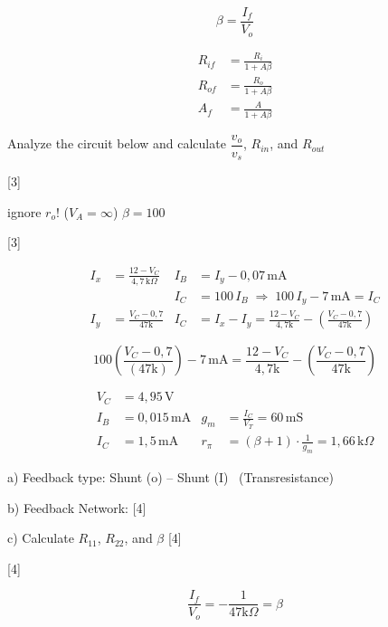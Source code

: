 \documentclass[11pt,a4paper]{article}
\begin{document}
\[ \beta = \frac{I_f}{V_o} \]

\begin{align*}
  R_{if} &= \frac{R_i}{1+A\beta} \\
  R_{of} &= \frac{R_o}{1+A\beta} \\
  A_f &= \frac{A}{1+A\beta}
\end{align*}

\begin{ornek}[2]
  Analyze the circuit below and calculate $\dfrac{v_o}{v_s}$, $R_{in}$, and $R_{out}$

  [3]

  ignore $r_o$! ($V_A=\infty$) \qquad $\beta=100$
\end{ornek}

[3]

\begin{align*}
  I_x &= \frac{12-V_C}{4{,}7\,\mathrm{k}\Omega} & I_B &= I_y - 0{,}07\,\mathrm{mA} \\
  & & I_C &= 100\,I_B \;\Rightarrow\; 100\,I_y - 7\,\mathrm{mA} = I_C \\
  I_y &= \frac{V_C-0{,}7}{47\mathrm{k}} & I_C &= I_x - I_y = \frac{12-V_C}{4{,}7\mathrm{k}} - \left(\frac{V_C-0{,}7}{47\mathrm{k}}\right)
\end{align*}

\[ 100\left(\frac{V_C-0{,}7}{(47\mathrm{k})}\right) - 7\,\mathrm{mA} = \frac{12-V_C}{4{,}7\mathrm{k}} - \left(\frac{V_C-0{,}7}{47\mathrm{k}}\right) \]

\begin{align*}
  V_C &= 4{,}95\,\mathrm{V} & & \\
  I_B &= 0{,}015\,\mathrm{mA} & g_m &= \frac{I_C}{V_T} = 60\,\mathrm{mS} \\
  I_C &= 1{,}5\,\mathrm{mA} & r_\pi &= (\beta+1)\cdot\frac{1}{g_m} = 1{,}66\,\mathrm{k}\Omega
\end{align*}

a) Feedback type: Shunt (o) -- Shunt (I) \ \textcolor{turuncukalem}{(Transresistance)}

b) Feedback Network:
[4]

c) Calculate $R_{11}$, $R_{22}$, and $\beta$
[4]

[4]

\[ \frac{I_f}{V_o} = -\frac{1}{47\mathrm{k}\Omega} = \beta \]
\end{document}
